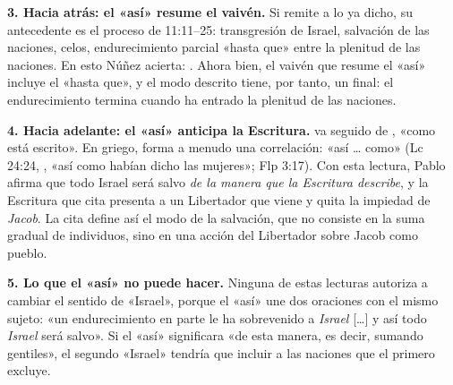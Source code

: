 \textbf{3. Hacia atrás: el «así» resume el vaivén.} Si  remite a lo ya dicho, su antecedente es el proceso de 11:11--25: transgresión de Israel, salvación de las naciones, celos, endurecimiento parcial «hasta que» entre la plenitud de las naciones. En esto Núñez acierta: . Ahora bien, el vaivén que resume el «así» incluye el «hasta que», y el modo descrito tiene, por tanto, un final: el endurecimiento termina cuando ha entrado la plenitud de las naciones.

\textbf{4. Hacia adelante: el «así» anticipa la Escritura.}  va seguido de , «como está escrito». En griego,  forma a menudo una correlación: «así \ldots{} como» (Lc 24:24, , «así como habían dicho las mujeres»; Flp 3:17). Con esta lectura, Pablo afirma que todo Israel será salvo \emph{de la manera que la Escritura describe}, y la Escritura que cita presenta a un Libertador que viene y quita la impiedad de \emph{Jacob}. La cita define así el modo de la salvación, que no consiste en la suma gradual de individuos, sino en una acción del Libertador sobre Jacob como pueblo.

\textbf{5. Lo que el «así» no puede hacer.} Ninguna de estas lecturas autoriza a cambiar el sentido de «Israel», porque el «así» une dos oraciones con el mismo sujeto: «un endurecimiento en parte le ha sobrevenido a \emph{Israel} [\ldots] y así todo \emph{Israel} será salvo». Si el «así» significara «de esta manera, es decir, sumando gentiles», el segundo «Israel» tendría que incluir a las naciones que el primero excluye.

